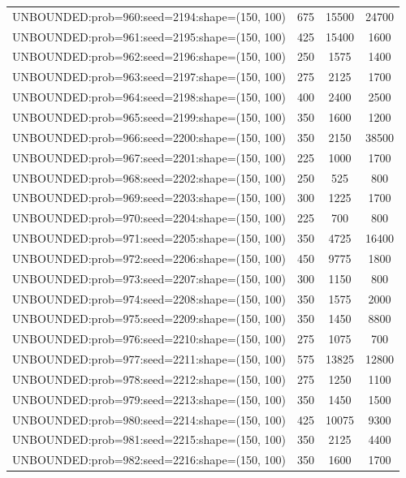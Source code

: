 \begin{longtable}{lccc}
UNBOUNDED:prob=960:seed=2194:shape=(150, 100) &      675 & 15500 &  24700 \\
UNBOUNDED:prob=961:seed=2195:shape=(150, 100) &      425 & 15400 &   1600 \\
UNBOUNDED:prob=962:seed=2196:shape=(150, 100) &      250 &  1575 &   1400 \\
UNBOUNDED:prob=963:seed=2197:shape=(150, 100) &      275 &  2125 &   1700 \\
UNBOUNDED:prob=964:seed=2198:shape=(150, 100) &      400 &  2400 &   2500 \\
UNBOUNDED:prob=965:seed=2199:shape=(150, 100) &      350 &  1600 &   1200 \\
UNBOUNDED:prob=966:seed=2200:shape=(150, 100) &      350 &  2150 &  38500 \\
UNBOUNDED:prob=967:seed=2201:shape=(150, 100) &      225 &  1000 &   1700 \\
UNBOUNDED:prob=968:seed=2202:shape=(150, 100) &      250 &   525 &    800 \\
UNBOUNDED:prob=969:seed=2203:shape=(150, 100) &      300 &  1225 &   1700 \\
UNBOUNDED:prob=970:seed=2204:shape=(150, 100) &      225 &   700 &    800 \\
UNBOUNDED:prob=971:seed=2205:shape=(150, 100) &      350 &  4725 &  16400 \\
UNBOUNDED:prob=972:seed=2206:shape=(150, 100) &      450 &  9775 &   1800 \\
UNBOUNDED:prob=973:seed=2207:shape=(150, 100) &      300 &  1150 &    800 \\
UNBOUNDED:prob=974:seed=2208:shape=(150, 100) &      350 &  1575 &   2000 \\
UNBOUNDED:prob=975:seed=2209:shape=(150, 100) &      350 &  1450 &   8800 \\
UNBOUNDED:prob=976:seed=2210:shape=(150, 100) &      275 &  1075 &    700 \\
UNBOUNDED:prob=977:seed=2211:shape=(150, 100) &      575 & 13825 &  12800 \\
UNBOUNDED:prob=978:seed=2212:shape=(150, 100) &      275 &  1250 &   1100 \\
UNBOUNDED:prob=979:seed=2213:shape=(150, 100) &      350 &  1450 &   1500 \\
UNBOUNDED:prob=980:seed=2214:shape=(150, 100) &      425 & 10075 &   9300 \\
UNBOUNDED:prob=981:seed=2215:shape=(150, 100) &      350 &  2125 &   4400 \\
UNBOUNDED:prob=982:seed=2216:shape=(150, 100) &      350 &  1600 &   1700 \\

\end{longtable}
